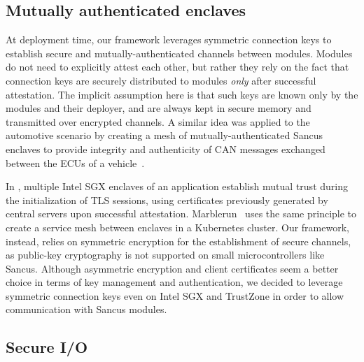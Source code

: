 \subsection{Mutually authenticated enclaves}
\label{sec:relwork:mutual}
%
At deployment time, our framework leverages symmetric connection keys to
establish secure and mutually-authenticated channels between modules. Modules do
not need to explicitly attest each other, but rather they rely on the fact that
connection keys are securely distributed to modules \textit{only} after
successful attestation. The implicit assumption here is that such keys are known
only by the modules and their deployer, and are always kept in secure memory and
transmitted over encrypted channels. A similar idea was applied to the
automotive scenario by creating a mesh of mutually-authenticated Sancus enclaves
to provide integrity and authenticity of CAN messages exchanged between the ECUs
of a vehicle~\cite{vanbulck_2017vulcan}.

In \cite{zheng2021secure}, multiple Intel \ac{SGX} enclaves of an application
establish mutual trust during the initialization of TLS sessions, using
certificates previously generated by central servers upon successful
attestation. Marblerun~\cite{marblerun} uses the same principle to create a
service mesh between enclaves in a Kubernetes cluster. Our framework, instead,
relies on symmetric encryption for the establishment of secure channels, as
public-key cryptography is not supported on small microcontrollers like Sancus.
Although asymmetric encryption and client certificates seem a better choice in
terms of key management and authentication, we decided to leverage symmetric
connection keys even on Intel \ac{SGX} and TrustZone in order to allow
communication with Sancus modules.

\subsection{Secure I/O}
\label{rel-work:secureio}

